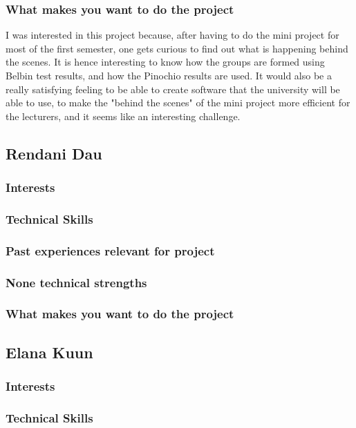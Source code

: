\documentclass[hidelinks, 12pt, oneside]{article}
\begin{document}
\subsubsection{What makes you want to do the project} 
I was interested in this project because, after having to do the mini project for most of the first semester, one gets curious to find out what is happening behind the scenes. It is hence interesting to know how the groups are formed using Belbin test results, and how the Pinochio results are used. It would also be a really satisfying feeling to be able to create software that the university will be able to use, to make the "behind the scenes" of the mini project more efficient for the lecturers, and it seems like an interesting challenge.
\\

\subsection{Rendani Dau}
\subsubsection{Interests}
\subsubsection{Technical Skills}
\subsubsection{Past experiences relevant for project}
\subsubsection{None technical strengths}
\subsubsection{What makes you want to do the project}

\subsection{Elana Kuun}
\subsubsection{Interests}
\subsubsection{Technical Skills}
\end{document}
